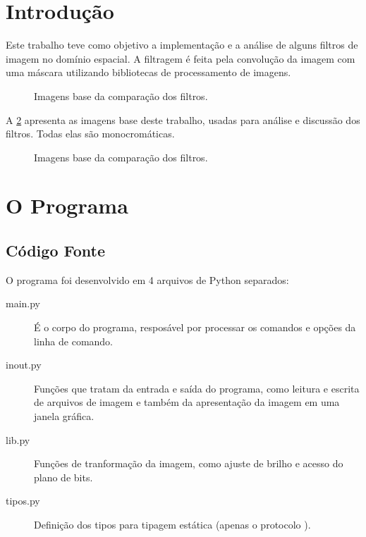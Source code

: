 \section{Introdução}

Este trabalho teve como objetivo a implementação e a análise de alguns filtros de imagem no domínio espacial. A filtragem é feita pela convolução da imagem com uma máscara utilizando bibliotecas de processamento de imagens.

\begin{figure}[H]
    \centering
    

    \caption{Imagens base da comparação dos filtros.}
    \label{fig:kern}
\end{figure}

A \cref{fig:base} apresenta as imagens base deste trabalho, usadas para análise e discussão dos filtros. Todas elas são monocromáticas.

\begin{figure}[H]
    \centering
    

    \caption{Imagens base da comparação dos filtros.}
    \label{fig:base}
\end{figure}

\section{O Programa}

\subsection{Código Fonte}

O programa foi desenvolvido em 4 arquivos de Python separados:

\begin{description}
    \item[main.py] É o corpo do programa, resposável por processar os comandos e opções da linha de comando.

    \item[inout.py] Funções que tratam da entrada e saída do programa, como leitura e escrita de arquivos de imagem e também da apresentação da imagem em uma janela gráfica.

    \item[lib.py] Funções de tranformação da imagem, como ajuste de brilho e acesso do plano de bits.

    \item[tipos.py] Definição dos tipos para tipagem estática (apenas o protocolo \autocite{ref:pep544} ).
\end{description}

